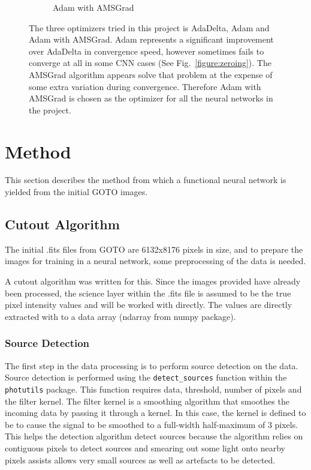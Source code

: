 \documentclass[a4paper,fleqn,usenatbib]{mnras}
\begin{document}
\begin{figure}
\begin{subfigure}{0.666\columnwidth}
 \caption{Adam with AMSGrad}
 \label{fig:AdamAMSGrad}
 \end{subfigure}

 \caption{The three optimizers tried in this project is AdaDelta, Adam and Adam with AMSGrad. Adam represents a significant improvement over AdaDelta in convergence speed, however sometimes fails to converge at all in some CNN cases (See Fig.~\ref{figure:zeroing}). The AMSGrad algorithm appears solve that problem at the expense of some extra variation during convergence. Therefore Adam with AMSGrad is chosen as the optimizer for all the neural networks in the project.}
 \label{fig:Optimizers}
 \end{figure}

 \section{Method}
This section describes the method from which a functional neural network is yielded from the initial GOTO images.
\subsection{Cutout Algorithm}
The initial .fits files from GOTO are 6132x8176 pixels in size, and to prepare the images for training in a neural network, some preprocessing of the data is needed. 

A cutout algorithm was written for this. Since the images provided have already been processed, the science layer within the .fits file is assumed to be the true pixel intensity values and will be worked with directly. The values are directly extracted with to a data array (ndarray from numpy package).

\subsubsection{Source Detection}
The first step in the data processing is to perform source detection on the data. Source detection is performed using the  \texttt{detect\_sources} function within the \texttt{photutils} package. This function requires data, threshold, number of pixels and the filter kernel. The filter kernel is a smoothing algorithm that smoothes the incoming data by passing it through a kernel. In this case, the kernel is defined to be to cause the signal to be smoothed to a full-width half-maximum of 3 pixels. This helps the detection algorithm detect sources because the algorithm relies on contiguous pixels to detect sources and smearing out some light onto nearby pixels assists allows very small sources as well as artefacts to be detected.
\end{document}
